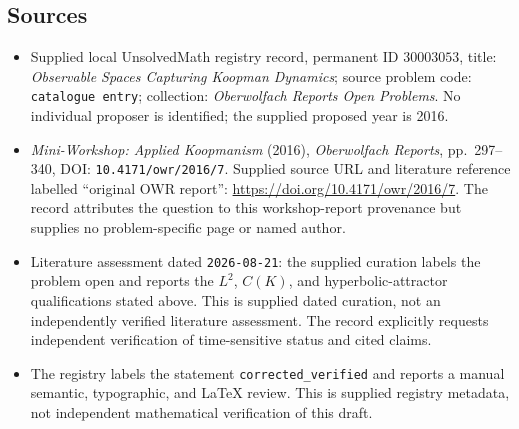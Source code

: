 \documentclass[11pt]{article}
\begin{document}
\subsection{Sources}
\begin{itemize}
\item Supplied local UnsolvedMath registry record, permanent ID \(30003053\), title: \emph{Observable Spaces Capturing Koopman Dynamics}; source problem code: \texttt{catalogue entry}; collection: \emph{Oberwolfach Reports Open Problems}. No individual proposer is identified; the supplied proposed year is 2016.
\item \emph{Mini-Workshop: Applied Koopmanism} (2016), \emph{Oberwolfach Reports}, pp.\ 297--340, DOI: \texttt{10.4171/owr/2016/7}. Supplied source URL and literature reference labelled ``original OWR report'': \url{https://doi.org/10.4171/owr/2016/7}. The record attributes the question to this workshop-report provenance but supplies no problem-specific page or named author.
\item Literature assessment dated \texttt{2026-08-21}: the supplied curation labels the problem open and reports the \(L^2\), \(C(K)\), and hyperbolic-attractor qualifications stated above. This is supplied dated curation, not an independently verified literature assessment. The record explicitly requests independent verification of time-sensitive status and cited claims.
\item The registry labels the statement \texttt{corrected\_verified} and reports a manual semantic, typographic, and LaTeX review. This is supplied registry metadata, not independent mathematical verification of this draft.
\end{itemize}
\end{document}
